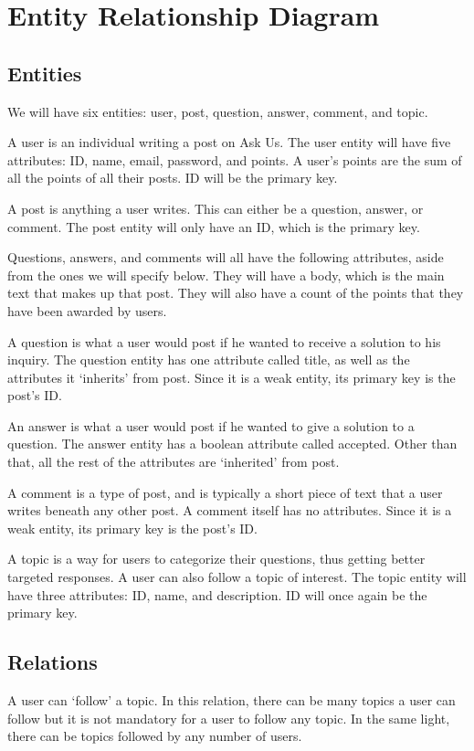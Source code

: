 \section{Entity Relationship Diagram}
\subsection{Entities}
We will have six entities: user, post, question, answer, comment, and topic.

A user is an individual writing a post on Ask Us. The user entity will have five attributes: ID, name, email, password, and points. A user's points are the sum of all the points of all their posts. ID will be the primary key.

A post is anything a user writes. This can either be a question, answer, or comment. The post entity will only have an ID, which is the primary key.

Questions, answers, and comments will all have the following attributes, aside from the ones we will specify below. They will have a body, which is the main text that makes up that post. They will also have a count of the points that they have been awarded by users.

A question is what a user would post if he wanted to receive a solution to his inquiry. The question entity has one attribute called title, as well as the attributes it `inherits' from post. Since it is a weak entity, its primary key is the post's ID.

An answer is what a user would post if he wanted to give a solution to a question. The answer entity has a boolean attribute called accepted. Other than that, all the rest of the attributes are `inherited' from post.

A comment is a type of post, and is typically a short piece of text that a user writes beneath any other post. A comment itself has no attributes. Since it is a weak entity, its primary key is the post's ID.

A topic is a way for users to categorize their questions, thus getting better targeted responses. A user can also follow a topic of interest. The topic entity will have three attributes: ID, name, and description. ID will once again be the primary key.

\subsection{Relations}
A user can `follow' a topic. In this relation, there can be many topics a user can follow but it is not mandatory for a user to follow any topic. In the same light, there can be topics followed by any number of users.

